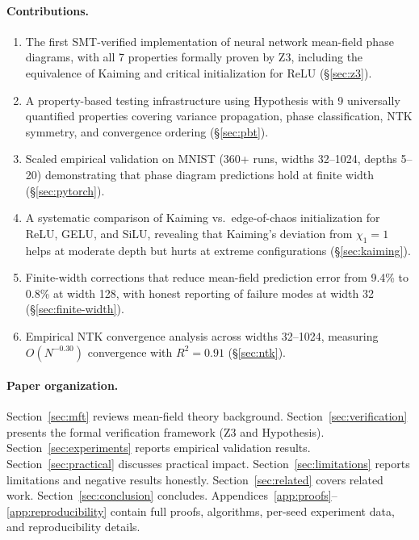 \documentclass[10pt]{article}
\begin{document}
\paragraph{Contributions.}
\begin{enumerate}[nosep]
    \item The first SMT-verified implementation of neural network mean-field phase diagrams, with all 7 properties formally proven by Z3, including the equivalence of Kaiming and critical initialization for ReLU (\S\ref{sec:z3}).
    \item A property-based testing infrastructure using Hypothesis with 9 universally quantified properties covering variance propagation, phase classification, NTK symmetry, and convergence ordering (\S\ref{sec:pbt}).
    \item Scaled empirical validation on MNIST (360+ runs, widths 32--1024, depths 5--20) demonstrating that phase diagram predictions hold at finite width (\S\ref{sec:pytorch}).
    \item A systematic comparison of Kaiming vs.\ edge-of-chaos initialization for ReLU, GELU, and SiLU, revealing that Kaiming's deviation from $\chi_1=1$ helps at moderate depth but hurts at extreme configurations (\S\ref{sec:kaiming}).
    \item Finite-width corrections that reduce mean-field prediction error from 9.4\% to 0.8\% at width 128, with honest reporting of failure modes at width 32 (\S\ref{sec:finite-width}).
    \item Empirical NTK convergence analysis across widths 32--1024, measuring $O(N^{-0.30})$ convergence with $R^2=0.91$ (\S\ref{sec:ntk}).
\end{enumerate}

\paragraph{Paper organization.}
Section~\ref{sec:mft} reviews mean-field theory background.
Section~\ref{sec:verification} presents the formal verification framework (Z3 and Hypothesis).
Section~\ref{sec:experiments} reports empirical validation results.
Section~\ref{sec:practical} discusses practical impact.
Section~\ref{sec:limitations} reports limitations and negative results honestly.
Section~\ref{sec:related} covers related work.
Section~\ref{sec:conclusion} concludes.
Appendices~\ref{app:proofs}--\ref{app:reproducibility} contain full proofs, algorithms, per-seed experiment data, and reproducibility details.
\end{document}
